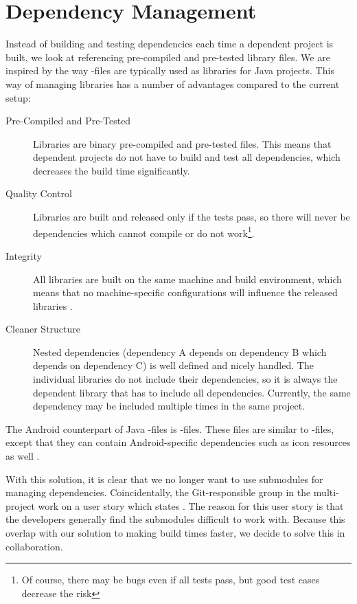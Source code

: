 \section{Dependency Management}\label{sec:dependency_management}
Instead of building and testing dependencies each time a dependent project is built, we look at referencing pre-compiled and pre-tested library files. We are inspired by the way -files are typically used as libraries for Java projects. This way of managing libraries has a number of advantages compared to the current setup:
\begin{description}
  \item [Pre-Compiled and Pre-Tested] Libraries are binary pre-compiled and pre-tested files. This means that dependent projects do not have to build and test all dependencies, which decreases the build time significantly.
  \item[Quality Control] Libraries are built and released only if the tests pass, so there will never be dependencies which cannot compile or do not work\footnote{Of course, there may be bugs even if all tests pass, but good test cases decrease the risk}.
  \item[Integrity] All libraries are built on the same machine and build environment, which means that no machine-specific configurations will influence the released libraries \parencite{humble2010, huttermann2014}.
  \item[Cleaner Structure] Nested dependencies (dependency A depends on dependency B which depends on dependency C) is well defined and nicely handled. The individual libraries do not include their dependencies, so it is always the dependent library that has to include all dependencies. Currently, the same dependency may be included multiple times in the same project.
\end{description}
The Android counterpart of Java -files is -files. These files are similar to -files, except that they can contain Android-specific dependencies such as icon resources as well \parencite{android-aar}.

With this solution, it is clear that we no longer want to use submodules for managing dependencies. Coincidentally, the Git-responsible group in the multi-project work on a user story which states . The reason for this user story is that the developers generally find the submodules difficult to work with. Because this overlap with our solution to making build times faster, we decide to solve this in collaboration.

